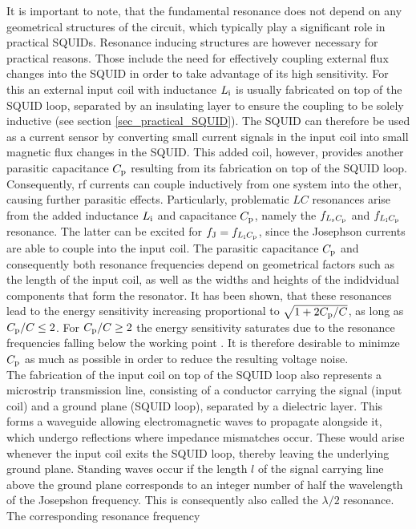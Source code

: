 It is important to note, that the fundamental resonance does not depend on any geometrical structures of the circuit, which typically play a significant role in practical SQUIDs. 
Resonance inducing structures are however necessary for practical reasons. Those include the need for effectively coupling  external flux changes into the SQUID in order to take advantage of its high sensitivity. For this an external input coil with inductance $L_{\rm i}$ is usually fabricated on top of the SQUID loop, separated by an insulating layer to ensure the coupling to be solely inductive (see section \ref{sec_practical_SQUID}). The SQUID can therefore be used as a current sensor by converting small current signals in the input coil into small magnetic flux changes in the SQUID. This added coil, however, provides another parasitic capacitance $C_{\rm p}$ resulting from its fabrication on top of the SQUID loop. Consequently, rf currents can couple inductively from one system into the other, causing further parasitic effects. Particularly, problematic $LC$ resonances arise from the added inductance $L_{\rm i}$ and capacitance $C_{\rm p}$, namely the $f_{L_{\rm s}C_{\rm p}}$ and $f_{L_{\rm i}C_{\rm p}}$ resonance. The latter can be excited for $f_{\rm J}=f_{L_{\rm i}C_{\rm p}}$, since the Josephson currents are able to couple into the input coil. The parasitic capacitance $C_{\rm p}$ and consequently both resonance frequencies depend on geometrical factors such as the length of the input coil, as well as the widths and heights of the indidvidual components that form the resonator. It has been shown, that these resonances lead to the energy sensitivity increasing proportional to $\sqrt{1+2C_{\rm p}/C}$, as long as $C_{\rm p}/C\leq 2$. For $C_{\rm p}/C\geq 2$ the energy sensitivity saturates due to the resonance frequencies falling below the working point \cite{Ryh1992}. It is therefore desirable to minimze $C_{\rm p}$ as much as possible in order to reduce the resulting voltage noise. \\

The fabrication of the input coil on top of the SQUID loop also represents a microstrip transmission line, consisting of a conductor carrying the signal (input coil) and a ground plane (SQUID loop), separated by a dielectric layer. This forms a waveguide allowing electromagnetic waves to propagate alongside it, which undergo reflections where impedance mismatches occur. These would arise whenever the input coil exits the SQUID loop, thereby leaving the underlying ground plane. Standing waves occur if the length $l$ of the signal carrying line above the ground plane corresponds to an integer number of half the wavelength of the Josepshon frequency. This is consequently also called the $\lambda/2$ resonance. The corresponding resonance frequency 


